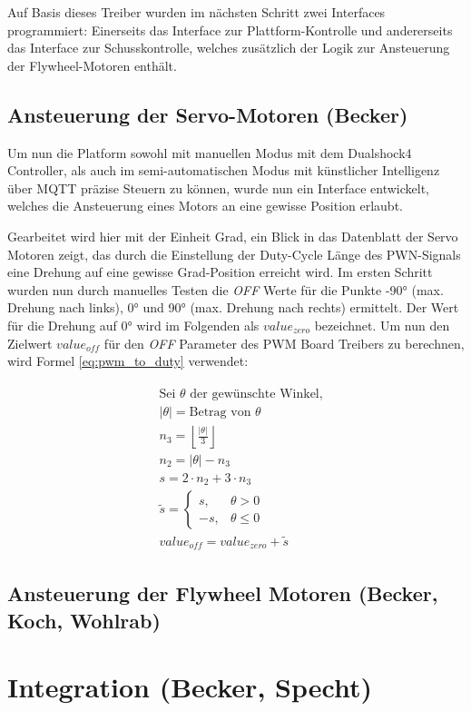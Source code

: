 Auf Basis dieses Treiber wurden im nächsten Schritt zwei Interfaces programmiert: 
Einerseits das Interface zur Plattform-Kontrolle und andererseits das Interface zur Schusskontrolle, welches zusätzlich der Logik zur Ansteuerung der Flywheel-Motoren enthält.

\subsection{Ansteuerung der Servo-Motoren (Becker)}

Um nun die Platform sowohl mit manuellen Modus mit dem Dualshock4 Controller, als auch im semi-automatischen Modus mit künstlicher Intelligenz über MQTT präzise Steuern zu können,
wurde nun ein Interface entwickelt, welches die Ansteuerung eines Motors an eine gewisse Position erlaubt. 

Gearbeitet wird hier mit der Einheit Grad, ein Blick in das Datenblatt der Servo Motoren zeigt,
das durch die Einstellung der Duty-Cycle Länge des PWN-Signals eine Drehung auf eine gewisse Grad-Position erreicht wird. 
Im ersten Schritt wurden nun durch manuelles Testen die \textit{OFF} Werte für die Punkte \ang{-90} (max. Drehung nach links), \ang{0} und \ang{90} (max. Drehung nach rechts) ermittelt. 
Der Wert für die Drehung auf \ang{0} wird im Folgenden als $value_{zero}$ bezeichnet. 
Um nun den Zielwert $value_{off}$ für den \textit{OFF} Parameter des PWM Board Treibers zu berechnen, wird Formel \ref{eq:pwm_to_duty} verwendet:

\begin{gather}
    \begin{aligned}
    &\text{Sei } \theta \text{ der gewünschte Winkel,} \\
    &|\theta| = \text{Betrag von } \theta \\
    &n_3 = \left\lfloor \frac{|\theta|}{3} \right\rfloor \\
    &n_2 = |\theta| - n_3 \\
    &s = 2 \cdot n_2 + 3 \cdot n_3 \\
    &\tilde{s} =
    \begin{cases}
    s, & \theta > 0 \\
    -s, & \theta \leq 0
    \end{cases} \\
    &value_{off} = value_{zero} + \tilde{s}
    \end{aligned}
    \label{eq:pwm_to_duty}
\end{gather}



\subsection{Ansteuerung der Flywheel Motoren (Becker, Koch, Wohlrab)}

\section{Integration (Becker, Specht)}